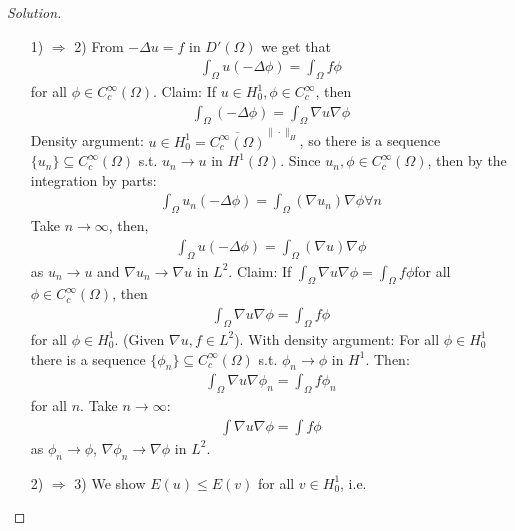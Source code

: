 \documentclass{report}
\theoremstyle{tommy}
\begin{document}
  \begin{proof}[Solution]\
    \begin{itemize}
      \item[1) \(\Rightarrow\) 2)] From \(- \Delta u = f\) in \(D'(\Omega)\) we get that 
      \begin{align*}
        \int_{\Omega} u(-\Delta \phi) = \int_\Omega f \phi
      \end{align*}
      for all \(\phi \in C_c^\infty(\Omega)\). Claim: If \(u \in H_0^1, \phi \in C_c^\infty\), then 
      \begin{align*}
        \int_\Omega (-\Delta \phi) = \int_\Omega \nabla u \nabla \phi
      \end{align*}
      Density argument: \(u \in H_0^1 = \overline{C_c^\infty(\Omega)}^{\|\cdot\|_{H}}\), so there is a sequence \(\{u_n\} \subseteq C_c^\infty(\Omega)\) s.t. \(u_n \to u\) in \(H^1(\Omega)\). Since \(u_n, \phi \in C_c^\infty(\Omega)\), then by the integration by parts:
      \begin{align*}
        \int_\Omega u_n(-\Delta \phi) = \int_\Omega (\nabla u_n) \nabla \phi \forall n
      \end{align*}
      Take \(n \to \infty\), then, 
      \begin{align*}
        \int_\Omega u (-\Delta \phi) = \int_\Omega (\nabla u) \nabla \phi 
      \end{align*}
      as \(u_n \to u\) and \(\nabla u_n \to \nabla u\) in \(L^2\).
      Claim: If \(\int_\Omega \nabla u \nabla \phi = \int_\Omega f \phi\)for all \(\phi \in C_c^\infty(\Omega)\), then 
      \begin{align*}
        \int_\Omega \nabla u \nabla \phi = \int_\Omega f \phi 
      \end{align*}
      for all \(\phi \in H_0^1\). (Given \(\nabla u, f \in L^2\)). With density argument: For all \(\phi \in H_0^1\) there is a sequence \(\{\phi_n\}\subseteq C_c^\infty(\Omega)\) s.t. \(\phi_n \to \phi\) in \(H^1\). Then:
      \begin{align*}
        \int_\Omega \nabla u \nabla \phi_n = \int_\Omega f \phi_n
      \end{align*}
      for all \(n\). Take \(n \to \infty\):
      \begin{align*}
        \int \nabla u \nabla \phi = \int f \phi
      \end{align*}
      as \(\phi_n \to \phi\), \(\nabla \phi_n \to \nabla \phi\) in \(L^2\).
      \item[2) \(\Rightarrow\) 3)] We show \(E(u) \le E(v)\) for all \(v \in H_0^1\), i.e. 

\end{itemize}
\end{proof}
\end{document}
